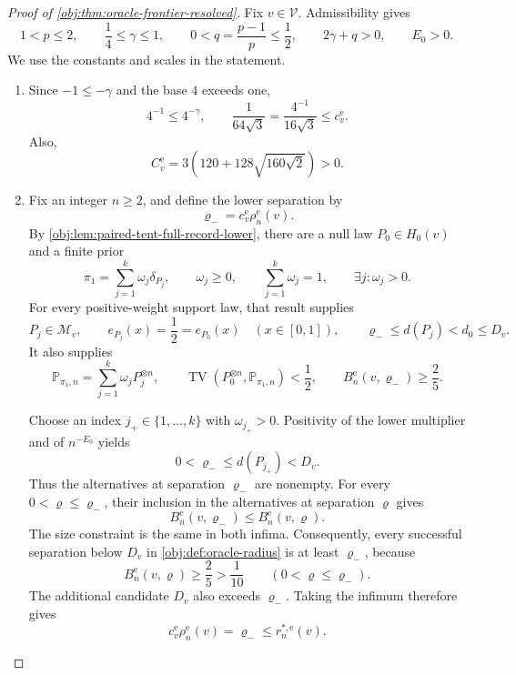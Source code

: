 \documentclass[11pt]{article}
\begin{document}
\begin{proof}[Proof of \cref{obj:thm:oracle-frontier-resolved}]
Fix \(v\in\mathcal V\). Admissibility gives
\[
1<p\le2,\qquad \frac14\le\gamma\le1,\qquad
0<q=\frac{p-1}{p}\le\frac12,\qquad
2\gamma+q>0,\qquad E_0>0.
\]
We use the constants and scales in the statement.

\begin{enumerate}
\item Since \(-1\le-\gamma\) and the base \(4\) exceeds one,
\[
4^{-1}\le4^{-\gamma},
\qquad
\frac{1}{64\sqrt3}
=\frac{4^{-1}}{16\sqrt3}
\le c^{\mathrm e}_v.
\]
Also,
\[
C^{\mathrm e}_v
=3\left(120+128\sqrt{160\sqrt2}\right)>0.
\]

\item Fix an integer \(n\ge2\), and define the lower separation by
\[
\varrho_-=c^{\mathrm e}_v\rho_n^{\mathrm e}(v).
\]
By \cref{obj:lem:paired-tent-full-record-lower}, there are a null law \(P_0\in H_0(v)\) and a finite prior
\[
\pi_1=\sum_{j=1}^{k}\omega_j\delta_{P_j},
\qquad
\omega_j\ge0,\qquad
\sum_{j=1}^{k}\omega_j=1,
\qquad
\exists j:\omega_j>0.
\]
For every positive-weight support law, that result supplies
\[
P_j\in\mathcal M_v,\qquad
e_{P_j}(x)=\frac12=e_{P_0}(x)\quad(x\in[0,1]),
\qquad
\varrho_-\le d(P_j)<d_0\le D_v.
\]
It also supplies
\[
\mathbb P_{\pi_1,n}
=\sum_{j=1}^{k}\omega_jP_j^{\otimes n},
\qquad
\operatorname{TV}\!\left(P_0^{\otimes n},\mathbb P_{\pi_1,n}\right)<\frac12,
\qquad
B_n^{\mathrm e}(v,\varrho_-)\ge\frac25.
\]

Choose an index \(j_+\in\{1,\ldots,k\}\) with \(\omega_{j_+}>0\). Positivity of the lower multiplier and of \(n^{-E_0}\) yields
\[
0<\varrho_-\le d(P_{j_+})<D_v.
\]
Thus the alternatives at separation \(\varrho_-\) are nonempty. For every \(0<\varrho\le\varrho_-\), their inclusion in the alternatives at separation \(\varrho\) gives
\[
B_n^{\mathrm e}(v,\varrho_-)
\le B_n^{\mathrm e}(v,\varrho).
\]
The size constraint is the same in both infima. Consequently, every successful separation below \(D_v\) in \cref{obj:def:oracle-radius} is at least \(\varrho_-\), because
\[
B_n^{\mathrm e}(v,\varrho)\ge\frac25>\frac1{10}
\qquad(0<\varrho\le\varrho_-).
\]
The additional candidate \(D_v\) also exceeds \(\varrho_-\). Taking the infimum therefore gives
\[
c^{\mathrm e}_v\rho_n^{\mathrm e}(v)
=\varrho_-\le r_n^{*,\mathrm e}(v).
\]


\end{enumerate}
\end{proof}
\end{document}
